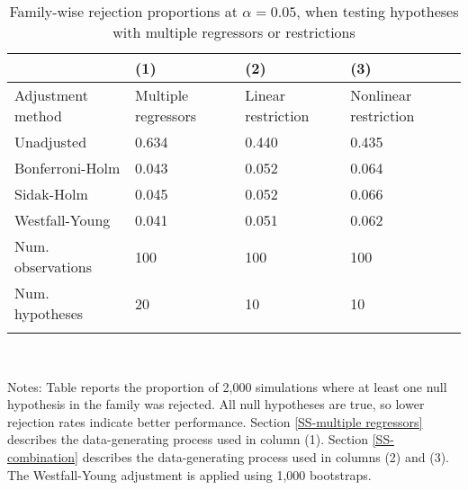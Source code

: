 \documentclass{article}
\begin{document}
\begin{table}[tbp] \centering
{}

\caption{Family-wise rejection proportions at \(\alpha = 0.05\), when testing hypotheses with multiple regressors or restrictions}
\label{tab:wyoung3}
\begin{tabularx}{\linewidth}{@{}lCCC@{}}

\toprule
&{(1)}&{(2)}&{(3)} \tabularnewline \midrule
{Adjustment method}&{Multiple regressors}&{Linear restriction}&{Nonlinear restriction} \tabularnewline
\midrule \addlinespace[\belowrulesep]
Unadjusted&0.634&0.440&0.435 \tabularnewline
Bonferroni-Holm&0.043&0.052&0.064 \tabularnewline
Sidak-Holm&0.045&0.052&0.066 \tabularnewline
Westfall-Young&0.041&0.051&0.062 \tabularnewline
\midrule Num. observations&100&100&100 \tabularnewline
Num. hypotheses&20&10&10 \tabularnewline
\bottomrule \addlinespace[\belowrulesep]

\end{tabularx}
\\ \parbox{\linewidth}{\footnotesize Notes: Table reports the proportion of 2,000 simulations where at least one null hypothesis in the family was rejected. All null hypotheses are true, so lower rejection rates indicate better performance. Section \ref{SS-multiple regressors} describes the data-generating process used in column (1). Section \ref{SS-combination} describes the data-generating process used in columns (2) and (3). The Westfall-Young adjustment is applied using 1,000 bootstraps.}
\end{table}
\end{document}

